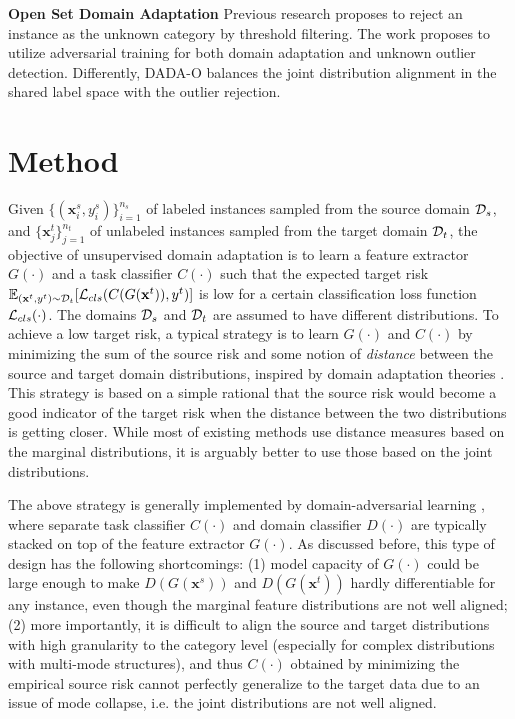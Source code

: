 \documentclass[letterpaper]{article} \usepackage{aaai20}  \usepackage{times}  \usepackage{helvet} \usepackage{courier}  \usepackage[hyphens]{url}  \usepackage{graphicx} \urlstyle{rm} \def\UrlFont{\rm}  \usepackage{graphicx}  \frenchspacing  \setlength{\pdfpagewidth}{8.5in}  \setlength{\pdfpageheight}{11in}
\begin{document}
\noindent\textbf{Open Set Domain Adaptation} Previous research \cite{open_set_svm} proposes to reject an instance as the unknown category by threshold filtering. The work \cite{bp_for_os} proposes to utilize adversarial training for both domain adaptation and unknown outlier detection. Differently, DADA-O balances the joint distribution alignment in the shared label space with the outlier rejection.

\section{Method}
Given $\{\left(\mathbf{x}_i^s, y_i^s\right)\}_{i=1}^{n_s}$ of labeled instances sampled from the source domain ${\cal{D}}_s$, and $\{\mathbf{x}_j^t\}_{j=1}^{{n}_t}$ of unlabeled instances sampled from the target domain ${\cal{D}}_t$, the objective of unsupervised domain adaptation is to learn a feature extractor $G(\cdot)$ and a task classifier $C(\cdot)$ such that the expected target risk ${\mathbb{E}}_{(\mathbf{x}^t, y^t)\sim {\cal{D}}_t}[{\cal{L}}_{cls}(C(G(\mathbf{x}^t)), y^t)]$ is low for a certain classification loss function ${\cal{L}}_{cls}(\cdot)$. The domains ${\cal{D}}_s$ and ${\cal{D}}_t$ are assumed to have different distributions. To achieve a low target risk, a typical strategy is to learn $G(\cdot)$ and $C(\cdot)$ by minimizing the sum of the source risk and some notion of \emph{distance} between the source and target domain distributions, inspired by domain adaptation theories \cite{da_theory1,da_theory2}. This strategy is based on a simple rational that the source risk would become a good indicator of the target risk when the distance between the two distributions is getting closer. While most of existing methods use distance measures based on the marginal distributions, it is arguably better to use those based on the joint distributions.

The above strategy is generally implemented by domain-adversarial learning \cite{dann,tada}, where separate task classifier $C(\cdot)$ and domain classifier $D(\cdot)$ are typically stacked on top of the feature extractor $G(\cdot)$.  As discussed before, this type of design has the following shortcomings: (1) model capacity of $G(\cdot)$ could be large enough to make $D(G(\mathbf{x}^s))$ and $D(G(\mathbf{x}^t))$ hardly differentiable for any instance, even though the marginal feature distributions are not well aligned; (2) more importantly, it is difficult to align the source and target distributions with high granularity to the category level (especially for complex distributions with multi-mode structures), and thus $C(\cdot)$ obtained by minimizing the empirical source risk cannot perfectly generalize to the target data due to an issue of mode collapse, i.e. the joint distributions are not well aligned.
\end{document}
